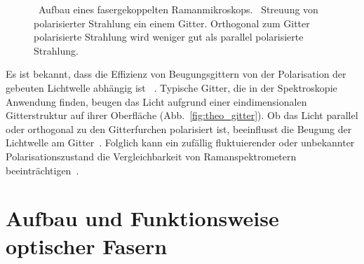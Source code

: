 \documentclass[a4paper,12pt,twoside,parskip=no,headsepline,open=right,ngerman,export]{scrreprt}
\begin{document}
            \begin{figure}[!h]
                \centering
                \hfil
                \caption[Skizze Ramanspektrometer]{~Aufbau eines fasergekoppelten Ramanmikroskops. ~Streuung von polarisierter Strahlung ein einem Gitter. Orthogonal zum Gitter polarisierte Strahlung wird weniger gut als parallel polarisierte Strahlung.}
            \end{figure}
            
            Es ist bekannt, dass die Effizienz von Beugungsgittern von der Polarisation der gebeuten Lichtwelle abhängig ist ~\cite{kho_reduction_2005}. Typische Gitter, die in der Spektroskopie Anwendung finden, beugen das Licht aufgrund einer eindimensionalen Gitterstruktur auf ihrer Oberfläche (Abb.~\ref{fig:theo_gitter}). Ob das Licht parallel oder orthogonal zu den Gitterfurchen polarisiert ist, beeinflusst die Beugung der Lichtwelle am Gitter~\cite{kho_reduction_2005}. Folglich kann ein zufällig fluktuierender oder unbekannter Polarisationszustand die Vergleichbarkeit von Ramanspektrometern beeinträchtigen~\cite{kho_reduction_2005}.
            
        \section{Aufbau und Funktionsweise optischer Fasern}
            
\end{document}
